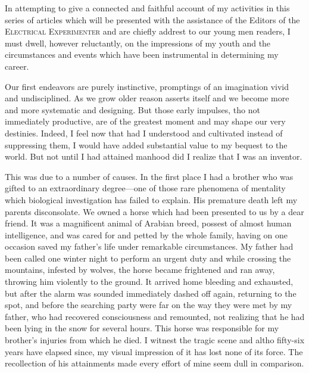\documentclass[a4paper,12pt,english,twoside,openright]{memoir}
\begin{document}
	In attempting to give a connected and faithful account of my activities in this series of articles 
	which will be presented with the assistance of the Editors of the \textsc{Electrical Experimenter}
	and are chiefly addrest to our young men readers, I must dwell, however reluctantly, on the 
	impressions of my youth and the circumstances and events which have been instrumental in 
	determining my career.  

	
	Our first endeavors are purely instinctive, promptings of an imagination vivid and undisciplined.  
	As we grow older reason asserts itself and we become more and more systematic and designing.  
	But those early impulses, tho not immediately productive, are of the greatest moment and may 
	shape our very destinies.  Indeed, I feel now that had I understood and cultivated instead of 
	suppressing them, I would have added substantial value to my bequest to the world.  But not until 
	I had attained manhood did I realize that I was an inventor.  
	
	This was due to a number of causes.  In the first place I had a brother who was gifted to an 
	extraordinary degree—one of those rare phenomena of mentality which biological investigation 
	has failed to explain.  His premature death left my parents disconsolate.  We owned a horse 
	which had been presented to us by a dear friend.  It was a magnificent animal of Arabian breed, 
	possest of almost human intelligence, and was cared for and petted by the whole family, having 
	on one occasion saved my father's life under remarkable circumstances.  My father had been 
	called one winter night to perform an urgent duty and while crossing the mountains, infested by 
	wolves, the horse became frightened and ran away, throwing him violently to the ground.  It 
	arrived home bleeding and exhausted, but after the alarm was sounded immediately dashed off 
	again, returning to the spot, and before the searching party were far on the way they were met by 
	my father, who had recovered consciousness and remounted, not realizing that he had been lying 
	in the snow for several hours.  This horse was responsible for my brother's injuries from which he 
	died.  I witnest the tragic scene and altho fifty-six years have elapsed since, my visual impression 
	of it has lost none of its force.  The recollection of his attainments made every effort of mine seem 
	dull in comparison.  
	
\end{document}
